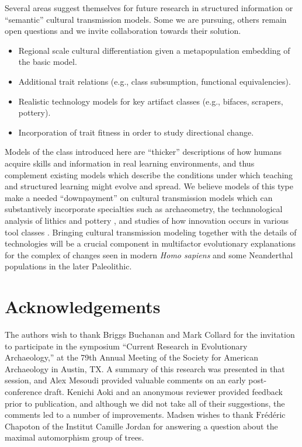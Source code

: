 Several areas suggest themselves for future research in structured
information or ``semantic'' cultural transmission models. Some we are
pursuing, others remain open questions and we invite collaboration
towards their solution.

\begin{itemize}
\itemsep1pt\parskip0pt
\item
  Regional scale cultural differentiation given a metapopulation
  embedding of the basic model.
\item
  Additional trait relations (e.g., class subsumption, functional
  equivalencies).
\item
  Realistic technology models for key artifact classes (e.g., bifaces,
  scrapers, pottery).
\item
  Incorporation of trait fitness in order to study directional change.
\end{itemize}

Models of the class introduced here are ``thicker'' descriptions of how
humans acquire skills and information in real learning environments, and
thus complement existing models which describe the conditions under
which teaching and structured learning might evolve and spread. We
believe models of this type make a needed ``downpayment'' on cultural
transmission models which can substantively incorporate specialties such
as archaeometry, the technnological analysis of lithics and pottery
\citep{tostevin2012seeing}, and studies of how innovation occurs in
various tool classes \citep[e.g.,][]{o2010innovation}. Bringing cultural
transmission modeling together with the details of technologies will be
a crucial component in multifactor evolutionary explanations for the
complex of changes seen in modern \emph{Homo sapiens} and some
Neanderthal populations in the later Paleolithic.

\section{Acknowledgements}\label{semax:sec:acknowledgements}

The authors wish to thank Briggs Buchanan and Mark Collard for the
invitation to participate in the symposium ``Current Research in
Evolutionary Archaeology,'' at the 79th Annual Meeting of the Society
for American Archaeology in Austin, TX. A summary of this research was
presented in that session, and Alex Mesoudi provided valuable comments
on an early post-conference draft. Kenichi Aoki and an anonymous
reviewer provided feedback prior to publication, and although we did not
take all of their suggestions, the comments led to a number of
improvements. Madsen wishes to thank $\textrm{Fr\'ed\'eric}$ Chapoton of
the Institut Camille Jordan for answering a question about the maximal
automorphism group of trees.

